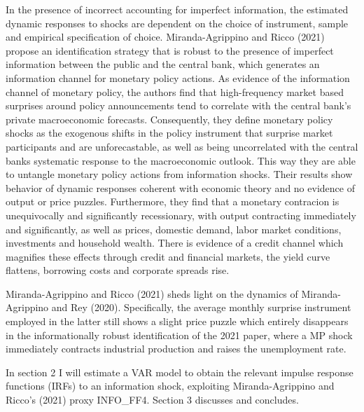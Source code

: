 \documentclass[11pt,a4paper,draft]{article}
\begin{document}
In the presence of incorrect accounting for imperfect information, the estimated dynamic responses to shocks are dependent on the choice of instrument, sample and empirical specification of choice. Miranda-Agrippino and Ricco (2021) propose an identification strategy that is robust to the presence of imperfect information between the public and the central bank, which generates an information channel for monetary policy actions. 
As evidence of the information channel of monetary policy, the authors find that high-frequency market based surprises around policy announcements tend to correlate with the central bank's private macroeconomic forecasts. Consequently, they define monetary policy shocks as the exogenous shifts in the policy instrument that surprise market participants and are unforecastable, as well as being uncorrelated with the central banks systematic response to the macroeconomic outlook.  This way they are able to untangle monetary policy actions from information shocks. 
Their results show behavior of dynamic responses coherent with economic theory and no evidence of output or price puzzles. Furthermore, they find that a monetary contracion is unequivocally and significantly recessionary, with output contracting immediately and significantly, as well as prices, domestic demand, labor market conditions, investments and household wealth. There is evidence of a credit channel which magnifies these effects through credit and financial markets, the yield curve flattens, borrowing costs and corporate spreads rise.





Miranda-Agrippino and Ricco (2021) sheds light on the dynamics of Miranda-Agrippino and Rey (2020). Specifically, the average monthly surprise instrument employed in the latter still shows a slight price puzzle which entirely disappears in the informationally robust identification of the 2021 paper, where a MP shock immediately contracts industrial production and raises the unemployment rate.




In section 2 I will estimate a VAR model to obtain the relevant impulse response functions (IRFs) to an information shock, exploiting Miranda-Agrippino and Ricco's (2021) proxy INFO\_FF4.
Section 3 discusses and concludes.
\end{document}
